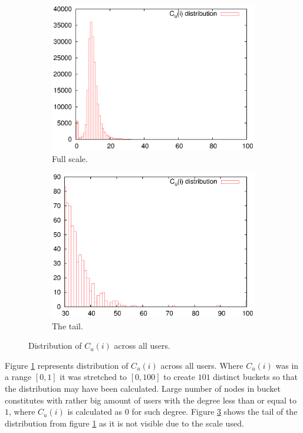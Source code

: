       \begin{figure}[H]
        \centering
        \begin{subfigure}[b]{0.49\textwidth}
          \centering
          \includegraphics[width=\textwidth]{chapters/03_implementation/cs_dist}
          \caption{Full scale.}
          \label{fig:cs_dist_full}
        \end{subfigure}
        \begin{subfigure}[b]{0.49\textwidth}
          \centering
          \includegraphics[width=\textwidth]{chapters/03_implementation/cs_dist_tail}
          \caption{The tail.}
          \label{fig:cs_dist_tail}
        \end{subfigure}
        \caption{Distribution of $C_u(i)$ across all users.}
      \end{figure}
      Figure \ref{fig:cs_dist_full} represents distribution of $C_u(i)$ across all users. Where $C_u(i)$ was in a range $[0, 1]$ it was stretched to $[0, 100]$ to create $101$ distinct buckets so that the distribution may have been calculated. Large number of nodes in  bucket constitutes with rather big amount of users with the degree less than or equal to $1$, where $C_u(i)$ is calculated as $0$ for such degree. Figure \ref{fig:cs_dist_tail} shows the tail of the distribution from figure \ref{fig:cs_dist_full} as it is not visible due to the scale used.
      
